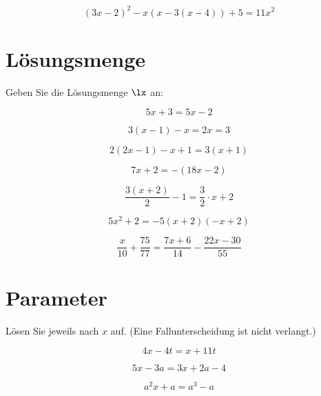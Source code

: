{\begin{bbwAufgabenBlock}
\item $$(3x-2)^2 -x(x-3(x-4))  + 5 = 11x^2$$

\end{bbwAufgabenBlock}
\newpage


\section{Lösungsmenge}
Geben Sie die Lösungsmenge $\lx$ an:

\begin{bbwAufgabenBlock}

\item $$5x+3 = 5x-2$$
\LoesungsBlock{$\lx=\{\}$}

\item $$3(x-1)-x = 2x=3$$

\item $$2(2x-1)-x+1 = 3(x+1)$$
\LoesungsBlock{$\lx=\{\}$}

\item $$7x+2 = -(18x - 2)$$

\item $$\frac{3(x+2)}2 - 1 = \frac32 \cdot{} x + 2$$

\item $$5x^2 + 2 = -5(x+2)(-x+2)$$
\LoesungsBlock{$\lx=\{\}$}

\item $$\frac{x}{10} + \frac{75}{77} = \frac{7x+6}{14} - \frac{22x-30}{55}$$

\end{bbwAufgabenBlock}
\newpage
\section{Parameter}
Lösen Sie jeweils nach $x$ auf. (Eine Fallunterscheidung ist nicht verlangt.)
\begin{bbwAufgabenBlock}
\item $$4x-4t = x+ 11t$$

\item $$5x-3a = 3x+2a-4$$

\item $$a^2x+a = a^3 -a$$


\end{bbwAufgabenBlock}}
